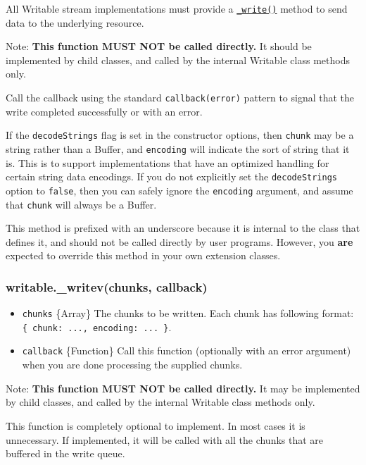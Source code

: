 All Writable stream implementations must provide a
\hyperref[streamux5fwritableux5fwriteux5fchunkux5fencodingux5fcallbackux5f1]{\texttt{\_write()}}
method to send data to the underlying resource.

Note: \textbf{This function MUST NOT be called directly.} It should be
implemented by child classes, and called by the internal Writable class
methods only.

Call the callback using the standard \texttt{callback(error)} pattern to
signal that the write completed successfully or with an error.

If the \texttt{decodeStrings} flag is set in the constructor options,
then \texttt{chunk} may be a string rather than a Buffer, and
\texttt{encoding} will indicate the sort of string that it is. This is
to support implementations that have an optimized handling for certain
string data encodings. If you do not explicitly set the
\texttt{decodeStrings} option to \texttt{false}, then you can safely
ignore the \texttt{encoding} argument, and assume that \texttt{chunk}
will always be a Buffer.

This method is prefixed with an underscore because it is internal to the
class that defines it, and should not be called directly by user
programs. However, you \textbf{are} expected to override this method in
your own extension classes.

\subsubsection{writable.\_writev(chunks,
callback)}\label{writable.ux5fwritevchunks-callback}

\begin{itemize}
\itemsep1pt\parskip0pt
\item
  \texttt{chunks} \{Array\} The chunks to be written. Each chunk has
  following format: \texttt{\{\ chunk:\ ...,\ encoding:\ ...\ \}}.
\item
  \texttt{callback} \{Function\} Call this function (optionally with an
  error argument) when you are done processing the supplied chunks.
\end{itemize}

Note: \textbf{This function MUST NOT be called directly.} It may be
implemented by child classes, and called by the internal Writable class
methods only.

This function is completely optional to implement. In most cases it is
unnecessary. If implemented, it will be called with all the chunks that
are buffered in the write queue.

